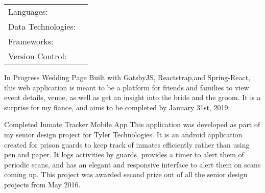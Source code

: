 \documentclass[]{awesome-cv}
\begin{document}

\begin{cventries}
\vspace{-2.5mm}
	\cventry
	{}
	{\def\arraystretch{1.15}{\begin{tabular}{ l l }
		Languages:  & {\skill{ Java, Javascript, Python, C\#, C++, C, Groovy, Haskell, \LaTeX}} \\
		Data Technologies:  & {\skill{ MySQL, PostgreSQL, Oracle SQL, IBM MQ, Rabbit MQ, ElasticSearch}} \\
		Frameworks:  & {\skill{ Spring, GatsbyJS, ReactJS, AngularJS, ASP.NET}} \\
		Version Control:  & {\skill{ SVN, GIT}} \\
		\end{tabular}}}
	{}
	{}
	{}
\end{cventries}

\vspace{-7mm}
\begin{cventries}
	\cventry
	{In Progress}
	{Wedding Page}
	{}
	{}
	{Built with GatsbyJS, Reactstrap,and Spring-React, this web application is meant to be a platform for friends and families to view event details, venue, as well as get an insight into the bride and the groom. It is a surprise for my fiance, and aims to be completed by January 31st, 2019.}	
	
\end{cventries}

\begin{cventries}
	\cventry
	{Completed}
	{Inmate Tracker Mobile App}
	{}
	{}
	{This application was developed as part of my senior design project for Tyler Technologies. It is an android application created for prison guards to keep track of inmates efficiently rather than using pen and paper.  It logs activities by guards, provides a timer to alert them of periodic scans, and has an elegant and responsive interface to alert them on scans coming up. This project was awarded second prize out of all the senior design projects from May 2016. }	
	\vspace{-5mm}
\end{cventries}

\ 
\end{document}
